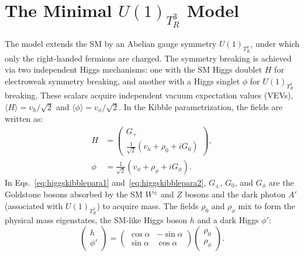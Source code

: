 \section{The Minimal $U(1)_{T_R^3}$ Model}\label{sec:model}


The model extends the SM by an Abelian gauge symmetry $U(1)_{T^3_R}$, under which only the right-handed fermions are charged. The symmetry breaking is achieved via two independent Higgs mechanisms: one with the SM Higgs doublet $H$ for electroweak symmetry breaking, and another with a Higgs singlet $\phi$ for $U(1)_{T^3_R}$ breaking. These scalars acquire independent vacuum expectation values (VEVs), $\langle H \rangle = v_h / \sqrt{2}$ and $\langle \phi \rangle = v_\phi / \sqrt{2}$. In the Kibble parametrization, the fields are written as:
\begin{align}
    H & = \begin{pmatrix}
        G_{+} \\
        \frac{1}{\sqrt{2}}\left(v_h + \rho_0 + i G_{0}\right)
    \end{pmatrix}, \label{eq:higgskibblepara1} \\
    \phi & = \frac{1}{\sqrt{2}}\left(v_\phi + \rho_\phi + i G_{\phi}\right). \label{eq:higgskibblepara2}
\end{align}
In Eqs.~\eqref{eq:higgskibblepara1} and~\eqref{eq:higgskibblepara2}, $G_\pm$, $G_0$, and $G_\phi$ are the Goldstone bosons absorbed by the SM $W^\pm$ and $Z$ bosons and the dark photon $A'$ (associated with $U(1)_{T^3_R}$) to acquire mass. The fields $\rho_0$ and $\rho_\phi$ mix to form the physical mass eigenstates, the SM-like Higgs boson $h$ and a dark Higgs $\phi'$:
\begin{equation}
    \begin{pmatrix}
        h \\
        \phi'
    \end{pmatrix}
    =
    \begin{pmatrix}
        \cos\alpha & -\sin\alpha \\
        \sin\alpha & \cos\alpha
    \end{pmatrix}
    \begin{pmatrix}
        \rho_0 \\
        \rho_\phi
    \end{pmatrix}.
\end{equation}
